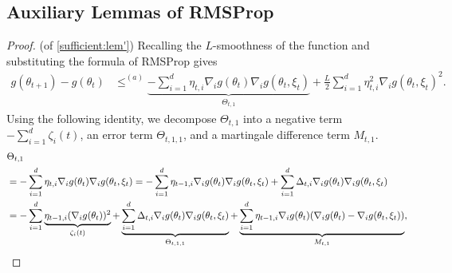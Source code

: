 \documentclass[standalone]{article}
\def\red#1{\textcolor{red}{#1}}
\newtheorem{remark}[theorem]{Remark}
\begin{document}

\subsection{Auxiliary Lemmas of RMSProp}\label{proof:lem:rmsprop}

\begin{proof}(of \cref{sufficient:lem'})
Recalling the $L$-smoothness of the function and substituting the formula of RMSProp gives
\begin{align}\label{adam_-1}
g(\theta_{t+1})-g(\theta_{t})& \mathop{\le}^{(a)}\underbrace{-\sum_{i=1}^{d}\eta_{t,i}\nabla_{i}g(\theta_{t})\nabla_{i}g(\theta_{t},\xi_{t})}_{\Theta_{t,1}}+\frac{ L}{2}\sum_{i=1}^{d}\eta_{t,i}^{2}\nabla_{i}g(\theta_{t},\xi_{t})^{2}.
\end{align}
Using the following identity, we decompose $\Theta_{t,1}$ into a negative term $-\sum_{i=1}^{d}\zeta_{i}(t)$, an error term $\Theta_{t,1,1}$, and a martingale difference term $M_{t,1}$.
\begin{align}\label{adam_0}
&\Theta_{t,1} \notag \\
&=-\sum_{i=1}^{d}\eta_{t,i}\nabla_{i}g(\theta_{t})\nabla_{i}g(\theta_{t},\xi_{t})=-\sum_{i=1}^{d}\eta_{{t-1},i}\nabla_{i}g(\theta_{t})\nabla_{i}g(\theta_{t},\xi_{t})+\sum_{i=1}^{d}\Delta_{t,i}\nabla_{i}g(\theta_{t})\nabla_{i}g(\theta_{t},\xi_{t})\notag\\&=-\sum_{i=1}^{d}\underbrace{\eta_{{t-1},i}(\nabla_{i}g(\theta_{t}))^{2}}_{\zeta_{i}(t)}+\underbrace{\sum_{i=1}^{d}\Delta_{t,i}\nabla_{i}g(\theta_{t})\nabla_{i}g(\theta_{t},\xi_{t})}_{\Theta_{t,1,1}}+\underbrace{\sum_{i=1}^{d}\eta_{{t-1},i}\nabla_{i}g(\theta_{t})(\nabla_{i} g(\theta_{t})-\nabla_{i}g(\theta_{t},\xi_{t}))}_{M_{t,1}},

\end{align}
\end{proof}
\end{document}
